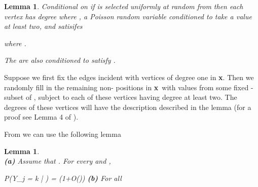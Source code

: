 \documentclass[11pt]{article}
\newenvironment{proof}{{\bf Proof:}}{\hfill\mbox{}}
\def\bx{{\bf x}}
\def\bx{{\bf x}}
\newcommand{\proofend}{\hspace*{\fill}\mbox{}}
\def\Pr{{\sf P}}
\def\vv{\vec{v}}
\newtheorem{lemma}[theorem]{Lemma}
\newcommand{\brac}[1]{\left(#1\right)}
\newcommand{\bfrac}[2]{\brac{\frac{#1}{#2}}}
\newcommand{\beq}[1]{}
\begin{document}
\begin{lemma}\label{trunp}
Conditional on  if  is selected uniformly at random from
 then each vertex  has degree  where , a Poisson random variable
conditioned to take a value at least two, and  satisifes

where .

The  are also conditioned to satisfy
. 
\end{lemma}
\begin{proof}
Suppose we first fix the edges incident with vertices of degree one in \bx. Then we randomly fill in the remaining
 non- positions in \bx\ with values from some fixed -subset  of , subject to each of these  vertices
having degree at least two. The degrees  of these vertices will have the description described in the lemma (for a proof 
see Lemma 4 of \cite{AFP}). 
\end{proof}

From \cite{AFP} we can use the following lemma
\begin{lemma} {\bf \cite{AFP}}\\
{\bf (a)} Assume that . For every  and ,
\beq{eq0}
\Pr(Y_j = k | \vv) = \brac{1+O\bfrac{k^2+1}{vz}}
\eeq
{\bf (b)} For all 

\end{lemma}
\proofend
\end{document}
